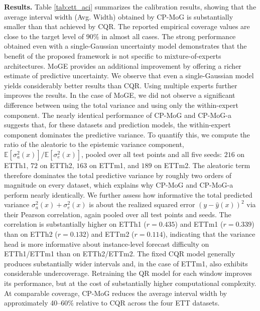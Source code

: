 {\bf Results.} Table \ref{tab:ett_aci} summarizes the calibration results, showing that the average interval width (Avg. Width) obtained by
CP-MoG is substantially smaller than that achieved by CQR. The reported empirical coverage values are close to the target level of $90\%$ in almost all cases.
The strong performance obtained even with a single-Gaussian uncertainty model demonstrates that the benefit of the proposed framework is not specific to mixture-of-experts architectures. MoGE provides an additional improvement by offering a richer estimate of predictive uncertainty.
 We observe that even a single-Gaussian model yields considerably better results than CQR. Using multiple experts further improves the results. In the case of MoGE, we did not observe a significant difference between using the total variance and using only the within-expert component. 
 The nearly identical performance of CP-MoG and CP-MoG-a suggests that, for these datasets and prediction models, the within-expert component dominates the predictive variance.
To quantify this, we compute the ratio of the aleatoric to the epistemic variance component, $\mathbb{E}[\sigma_a^2(x)] / \mathbb{E}[\sigma_e^2(x)]$, pooled over all test points and all five seeds: $216$ on ETTh1, $72$ on ETTh2, $163$ on ETTm1, and $189$ on ETTm2. The aleatoric term therefore dominates the total predictive variance by roughly two orders of magnitude on every dataset, which explains why CP-MoG and CP-MoG-a perform nearly identically.
We further assess how informative the total predicted variance $\sigma_a^2(x)+\sigma_e^2(x)$ is about the realized squared error $(y-\hat{y}(x))^2$ via their Pearson correlation, again pooled over all test points and seeds. The correlation is substantially higher on ETTh1 ($r=0.435$) and ETTm1 ($r=0.339$) than on ETTh2 ($r=0.132$) and ETTm2 ($r=0.114$), indicating that the variance head is more informative about instance-level forecast difficulty on ETTh1/ETTm1 than on ETTh2/ETTm2.
   The fixed CQR model generally produces substantially wider intervals and, in the case of ETTm1, also exhibits considerable undercoverage. Retraining the QR model for each window improves its performance, but at the cost of substantially higher computational complexity.
  At comparable coverage, CP-MoG reduces the average interval width by approximately 40–60\% relative to CQR across the four ETT datasets.


